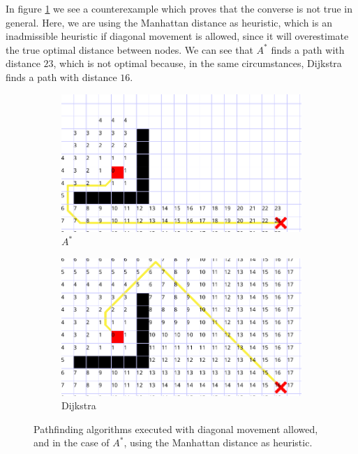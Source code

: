 \documentclass[12pt]{report}
\begin{document}
In figure \ref{fig:counterexample:admissible} we see a counterexample which proves that the converse is not true in general. Here, we are using the Manhattan distance as heuristic, which is an inadmissible heuristic if diagonal movement is allowed, since it will overestimate the true optimal distance between nodes. We can see that $A^*$ finds a path with distance $23$, which is not optimal because, in the same circumstances, Dijkstra finds a path with distance $16$.

\begin{figure}
\centering
\begin{subfigure}[b]{0.65\textwidth}
	\includegraphics[width=1\linewidth]{astar-fail}
	\caption{$A^*$}
\end{subfigure}
\begin{subfigure}[b]{0.65\textwidth}
	\includegraphics[width=1\linewidth]{astar-fail-dijkstra}
	\caption{Dijkstra}
\end{subfigure}
\caption{Pathfinding algorithms executed with diagonal movement allowed, and in the case of $A^*$, using the Manhattan distance as heuristic.}
\label{fig:counterexample:admissible}
\end{figure}
\end{document}

